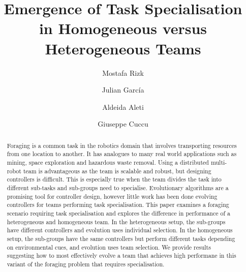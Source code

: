\documentclass[sigconf]{aamas}  %
\begin{document}
\title{Emergence of Task Specialisation in Homogeneous versus Heterogeneous Teams}  

 \author{Mostafa Rizk}

 \author{Julian Garc\'ia}

 \author{Aldeida Aleti}
 
  \author{Giuseppe Cuccu}



\begin{abstract}  %

Foraging is a common task in the robotics domain that involves transporting resources from one location to another. It has analogues to many real world applications such as mining, space exploration and hazardous waste removal. Using a distributed multi-robot team is advantageous as the team is scalable and robust, but designing controllers is difficult. This is especially true when the team divides the task into different sub-tasks and sub-groups need to specialise. Evolutionary algorithms are a promising tool for controller design, however little work has been done evolving controllers for teams performing task specialisation. This paper examines a foraging scenario requiring task specialisation and explores the difference in performance of a heterogeneous and homogeneous team. In the heterogeneous setup, the sub-groups have different controllers and evolution uses individual selection. In the homogeneous setup, the sub-groups have the same controllers but perform different tasks depending on environmental cues, and evolution uses team selection. We provide results suggesting how to most effectively evolve a team that achieves high performane in this variant of the foraging problem that requires specialisation.

\end{abstract}
\end{document}
